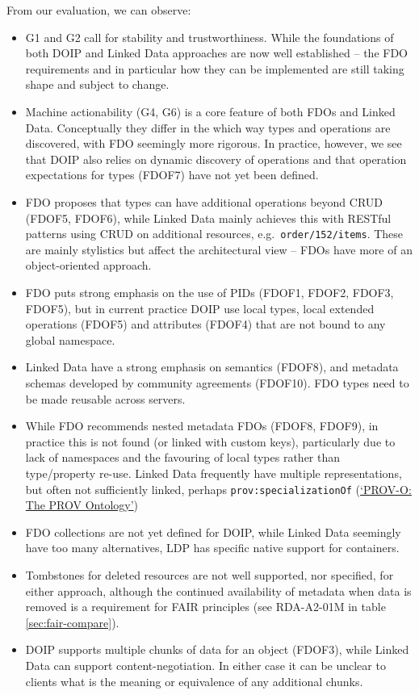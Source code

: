 From our evaluation, we can observe:

\begin{itemize}
\tightlist
\item
  G1 and G2 call for stability and trustworthiness. While the foundations of both DOIP and Linked Data approaches are now well established -- the FDO requirements and in particular how they can be implemented are still taking shape and subject to change.
\item
  Machine actionability (G4, G6) is a core feature of both FDOs and Linked Data. Conceptually they differ in the which way types and operations are discovered, with FDO seemingly more rigorous. In practice, however, we see that DOIP also relies on dynamic discovery of operations and that operation expectations for types (FDOF7) have not yet been defined.
\item
  FDO proposes that types can have additional operations beyond CRUD (FDOF5, FDOF6), while Linked Data mainly achieves this with RESTful patterns using CRUD on additional resources, e.g.~\texttt{order/152/items}. These are mainly stylistics but affect the architectural view -- FDOs have more of an object-oriented approach.
\item
  FDO puts strong emphasis on the use of PIDs (FDOF1, FDOF2, FDOF3, FDOF5), but in current practice DOIP use local types, local extended operations (FDOF5) and attributes (FDOF4) that are not bound to any global namespace.
\item
  Linked Data have a strong emphasis on semantics (FDOF8), and metadata schemas developed by community agreements (FDOF10). FDO types need to be made reusable across servers.
\item
  While FDO recommends nested metadata FDOs (FDOF8, FDOF9), in practice this is not found (or linked with custom keys), particularly due to lack of namespaces and the favouring of local types rather than type/property re-use. Linked Data frequently have multiple representations, but often not sufficiently linked, perhaps \texttt{prov:specializationOf} (\protect\hyperlink{ref-9T4j3N4e}{{`PROV-O: The PROV Ontology'}})
\item
  FDO collections are not yet defined for DOIP, while Linked Data seemingly have too many alternatives, LDP has specific native support for containers.
\item
  Tombstones for deleted resources are not well supported, nor specified, for either approach, although the continued availability of metadata when data is removed is a requirement for FAIR principles (see RDA-A2-01M in table \ref{sec:fair-compare}).
\item
  DOIP supports multiple chunks of data for an object (FDOF3), while Linked Data can support content-negotiation. In either case it can be unclear to clients what is the meaning or equivalence of any additional chunks.
\end{itemize}

